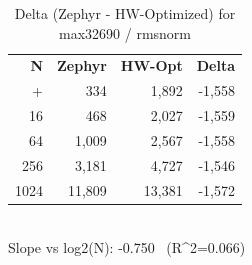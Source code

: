 \begin{table}[tb]
    \centering
    \caption{Delta (Zephyr - HW-Optimized) for max32690 / rmsnorm}
    \label{tab:delta_max32690_rmsnorm}
    \scriptsize
    \begin{tabular}{r r r r}
        \hline
        \textbf{N} & \textbf{Zephyr} & \textbf{HW-Opt} & \textbf{Delta} \\\n+        \hline
        4 & 334 & 1,892 & -1,558\\
        16 & 468 & 2,027 & -1,559\\
        64 & 1,009 & 2,567 & -1,558\\
        256 & 3,181 & 4,727 & -1,546\\
        1024 & 11,809 & 13,381 & -1,572\\
        \hline
    \end{tabular}
    \vspace{2mm}\\\n    Slope vs log2(N): -0.750 \ (R^2=0.066)\n\end{table}

